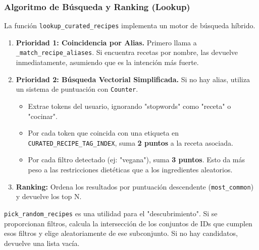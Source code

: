 \documentclass[letterpaper,12pt]{article}
\begin{document}
\subsubsection{Algoritmo de Búsqueda y Ranking (Lookup)}

La función \texttt{lookup\_curated\_recipes} implementa un motor de búsqueda híbrido.
\begin{enumerate}
    \item \textbf{Prioridad 1: Coincidencia por Alias.} Primero llama a \texttt{\_match\_recipe\_aliases}. Si encuentra recetas por nombre, las devuelve inmediatamente, asumiendo que es la intención más fuerte.
    \item \textbf{Prioridad 2: Búsqueda Vectorial Simplificada.} Si no hay alias, utiliza un sistema de puntuación con \texttt{Counter}.
    \begin{itemize}
        \item Extrae tokens del usuario, ignorando "stopwords" como "receta" o "cocinar".
        \item Por cada token que coincida con una etiqueta en \texttt{CURATED\_RECIPE\_TAG\_INDEX}, suma \textbf{2 puntos} a la receta asociada.
        \item Por cada filtro detectado (ej: "vegana"), suma \textbf{3 puntos}. Esto da más peso a las restricciones dietéticas que a los ingredientes aleatorios.
    \end{itemize}
    \item \textbf{Ranking:} Ordena los resultados por puntuación descendente (\texttt{most\_common}) y devuelve los top N.
\end{enumerate}

\texttt{pick\_random\_recipes} es una utilidad para el "descubrimiento". Si se proporcionan filtros, calcula la intersección de los conjuntos de IDs que cumplen esos filtros y elige aleatoriamente de ese subconjunto. Si no hay candidatos, devuelve una lista vacía.
\end{document}
